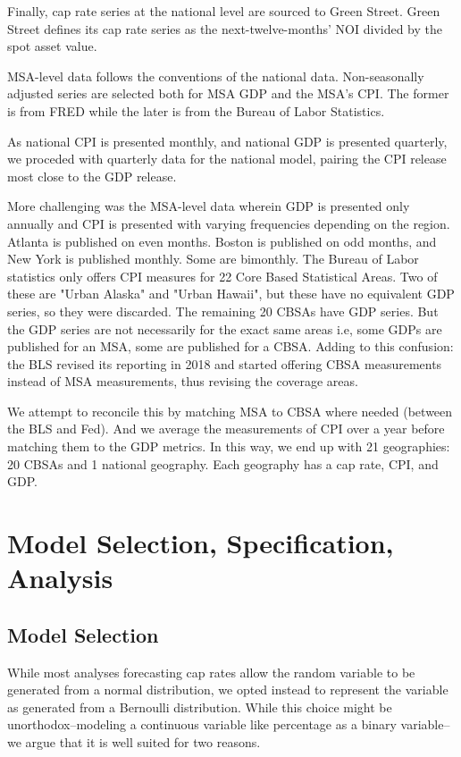 Finally, cap rate series at the national level are sourced to Green Street. Green Street defines its cap rate series as the next-twelve-months' NOI divided by the spot asset value. 

MSA-level data follows the conventions of the national data. Non-seasonally adjusted series are selected both for MSA GDP and the MSA's CPI. The former is from FRED while the later is from the Bureau of Labor Statistics.

As national CPI is presented monthly, and national GDP is presented quarterly, we proceded with quarterly data for the national model, pairing the CPI release most close to the GDP release. 

More challenging was the MSA-level data wherein GDP is presented only annually and CPI is presented with varying frequencies depending on the region. Atlanta is published on even months. Boston is published on odd months, and New York is published monthly. Some are bimonthly. The Bureau of Labor statistics only offers CPI measures for 22 Core Based Statistical Areas. Two of these are "Urban Alaska" and "Urban Hawaii", but these have no equivalent GDP series, so they were discarded. The remaining 20 CBSAs have GDP series. But the GDP series are not necessarily for the exact same areas i.e, some GDPs are published for an MSA, some are published for a CBSA. Adding to this confusion: the BLS revised its reporting in 2018 and started offering CBSA measurements instead of MSA measurements, thus revising the coverage areas.

We attempt to reconcile this by matching MSA to CBSA where needed (between the BLS and Fed). And we average the measurements of CPI over a year before matching them to the GDP metrics. In this way, we end up with 21 geographies: 20 CBSAs and 1 national geography. Each geography has a cap rate, CPI, and GDP. 
 
\section{Model Selection, Specification, Analysis}

\subsection{Model Selection}
While most analyses forecasting cap rates allow the random variable to be generated from a normal distribution, we opted instead to represent the variable as generated from a Bernoulli distribution. While this choice might be unorthodox--modeling a continuous variable like percentage as a binary variable-- we argue that it is well suited for two reasons. 

